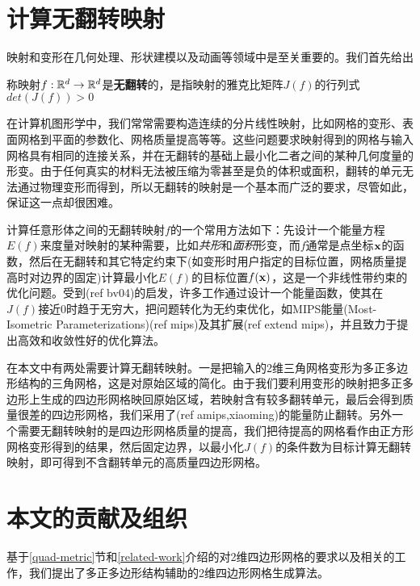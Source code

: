 \section{计算无翻转映射}\label{invertion-free}
映射和变形在几何处理、形状建模以及动画等领域中是至关重要的。我们首先给出
\begin{definition}\label{def:local-injective}
称映射$f:\mathbb{R}^d \rightarrow \mathbb{R}^d$是\textbf{无翻转}的，是指映射的雅克比矩阵$J(f)$的行列式$det(J(f))>0$
\end{definition}
在计算机图形学中，我们常常需要构造连续的分片线性映射，比如网格的变形、表面网格到平面的参数化、网格质量提高等等。这些问题要求映射得到的网格与输入网格具有相同的连接关系，并在无翻转的基础上最小化二者之间的某种几何度量的形变。由于任何真实的材料无法被压缩为零甚至是负的体积或面积，翻转的单元无法通过物理变形而得到，所以无翻转的映射是一个基本而广泛的要求，尽管如此，保证这一点却很困难。

计算任意形体之间的无翻转映射$f$的一个常用方法如下：先设计一个能量方程$E(f)$来度量对映射的某种需要，比如\emph{共形}和\emph{面积}形变，而$f$通常是点坐标$\mathbf{x}$的函数，然后在无翻转和其它特定约束下(如变形时用户指定的目标位置，网格质量提高时对边界的固定)计算最小化$E(f)$的目标位置$f(\mathbf{x})$，这是一个非线性带约束的优化问题。受到(ref bv04)的启发，许多工作通过设计一个能量函数，使其在$J(f)$接近0时趋于无穷大，把问题转化为无约束优化，如MIPS能量(Most-Isometric Parameterizations)(ref mips)及其扩展(ref extend mips)，并且致力于提出高效和收敛性好的优化算法。

在本文中有两处需要计算无翻转映射。一是把输入的2维三角网格变形为多正多边形结构的三角网格，这是对原始区域的简化。由于我们要利用变形的映射把多正多边形上生成的四边形网格映回原始区域，若映射含有较多翻转单元，最后会得到质量很差的四边形网格，我们采用了(ref amips,xiaoming)的能量防止翻转。另外一个需要无翻转映射的是四边形网格质量的提高，我们把待提高的网格看作由正方形网格变形得到的结果，然后固定边界，以最小化$J(f)$的条件数为目标计算无翻转映射，即可得到不含翻转单元的高质量四边形网格。


\section{本文的贡献及组织}\label{contri-organ}
基于\ref{quad-metric}节和\ref{related-work}介绍的对2维四边形网格的要求以及相关的工作，我们提出了多正多边形结构辅助的2维四边形网格生成算法。%


